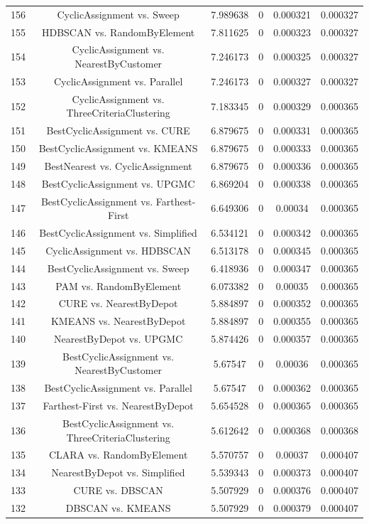 \documentclass[a4paper,10pt]{article}
\begin{document}
\begin{landscape}
\begin{table}[!htp]
\begin{tabular}{cccccc}
156&CyclicAssignment vs. Sweep&7.989638&0&0.000321&0.000327\\
155&HDBSCAN vs. RandomByElement&7.811625&0&0.000323&0.000327\\
154&CyclicAssignment vs. NearestByCustomer&7.246173&0&0.000325&0.000327\\
153&CyclicAssignment vs. Parallel&7.246173&0&0.000327&0.000327\\
152&CyclicAssignment vs. ThreeCriteriaClustering&7.183345&0&0.000329&0.000365\\
151&BestCyclicAssignment vs. CURE&6.879675&0&0.000331&0.000365\\
150&BestCyclicAssignment vs. KMEANS&6.879675&0&0.000333&0.000365\\
149&BestNearest vs. CyclicAssignment&6.879675&0&0.000336&0.000365\\
148&BestCyclicAssignment vs. UPGMC&6.869204&0&0.000338&0.000365\\
147&BestCyclicAssignment vs. Farthest-First&6.649306&0&0.00034&0.000365\\
146&BestCyclicAssignment vs. Simplified&6.534121&0&0.000342&0.000365\\
145&CyclicAssignment vs. HDBSCAN&6.513178&0&0.000345&0.000365\\
144&BestCyclicAssignment vs. Sweep&6.418936&0&0.000347&0.000365\\
143&PAM vs. RandomByElement&6.073382&0&0.00035&0.000365\\
142&CURE vs. NearestByDepot&5.884897&0&0.000352&0.000365\\
141&KMEANS vs. NearestByDepot&5.884897&0&0.000355&0.000365\\
140&NearestByDepot vs. UPGMC&5.874426&0&0.000357&0.000365\\
139&BestCyclicAssignment vs. NearestByCustomer&5.67547&0&0.00036&0.000365\\
138&BestCyclicAssignment vs. Parallel&5.67547&0&0.000362&0.000365\\
137&Farthest-First vs. NearestByDepot&5.654528&0&0.000365&0.000365\\
136&BestCyclicAssignment vs. ThreeCriteriaClustering&5.612642&0&0.000368&0.000368\\
135&CLARA vs. RandomByElement&5.570757&0&0.00037&0.000407\\
134&NearestByDepot vs. Simplified&5.539343&0&0.000373&0.000407\\
133&CURE vs. DBSCAN&5.507929&0&0.000376&0.000407\\
132&DBSCAN vs. KMEANS&5.507929&0&0.000379&0.000407\\

\end{tabular}
\end{table}
\end{landscape}
\end{document}
